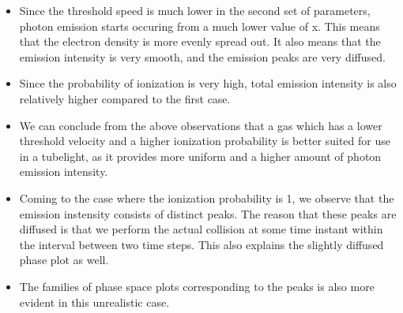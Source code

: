 \documentclass[11pt]{article}
\begin{document}
\begin{itemize}
\item
  Since the threshold speed is much lower in the second set of
  parameters, photon emission starts occuring from a much lower value of
  x. This means that the electron density is more evenly spread out. It
  also means that the emission intensity is very smooth, and the
  emission peaks are very diffused.
\item
  Since the probability of ionization is very high, total emission
  intensity is also relatively higher compared to the first case.
\item
  We can conclude from the above observations that a gas which has a
  lower threshold velocity and a higher ionization probability is better
  suited for use in a tubelight, as it provides more uniform and a
  higher amount of photon emission intensity.
\item
  Coming to the case where the ionization probability is 1, we observe
  that the emission instensity consists of distinct peaks. The reason
  that these peaks are diffused is that we perform the actual collision
  at some time instant within the interval between two time steps. This
  also explains the slightly diffused phase plot as well.
\item
  The families of phase space plots corresponding to the peaks is also
  more evident in this unrealistic case.
\end{itemize}

	


    
    
    
    
\end{document}
